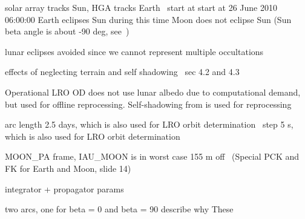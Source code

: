 solar array tracks Sun, HGA tracks Earth~\cite{Tooley2010}
start at start at 26 June 2010 06:00:00
Earth eclipses Sun during this time
Moon does not eclipse Sun (Sun beta angle is about -90 deg, see~\cite{Tooley2010})

lunar eclipses avoided since we cannot represent multiple occultations

effects of neglecting terrain and self shadowing~\cite{Mazarico2018} sec 4.2 and 4.3


Operational LRO OD does not use lunar albedo due to computational demand, but used for offline reprocessing.
Self-shadowing from \citeauthor{Mazarico2009} is used for reprocessing~\cite{Nicholson2010}

arc length 2.5 days, which is also used for LRO orbit determination~\cite{Mazarico2011}
step 5 s, which is also used for LRO orbit determination~\cite{Mazarico2018}

MOON\_PA frame, IAU\_MOON is in worst case 155 m off~\cite{NAIF2020} (Special PCK and FK for Earth and Moon, slide 14)

integrator + propagator params



two arcs, one for beta = 0 and beta = 90
describe why These
